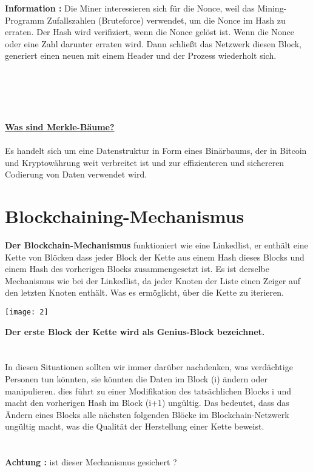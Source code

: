 \documentclass[ngerman]{scrreprt}
\begin{document}
\color{green}
\huge{\textbf{Information :}} 
\color{black}
\normalsize
Die Miner interessieren sich für die Nonce, weil das Mining-Programm Zufallszahlen (Bruteforce) verwendet, um die Nonce im Hash zu erraten. Der Hash wird verifiziert, wenn die Nonce gelöst ist. Wenn die Nonce oder eine Zahl darunter erraten wird. Dann schließt das Netzwerk diesen Block, generiert einen neuen mit einem Header und der Prozess wiederholt sich. \\ \\ \\ \\ \\ \\

\large
\underline{\textbf{Was sind Merkle-Bäume?}} \\ \\
\normalsize
Es handelt sich um eine Datenstruktur in Form eines Binärbaums, der in Bitcoin und Kryptowährung weit verbreitet ist und zur effizienteren und sichereren Codierung von Daten verwendet wird.




\section{Blockchaining-Mechanismus}
\textbf{Der Blockchain-Mechanismus} funktioniert wie eine Linkedlist, er enthält eine Kette von Blöcken
dass jeder Block der Kette aus einem Hash dieses Blocks und einem Hash des vorherigen Blocks zusammengesetzt ist. Es ist derselbe Mechanismus wie bei der Linkedlist, da jeder Knoten der Liste einen Zeiger auf den letzten Knoten enthält. Was es ermöglicht, über die Kette zu iterieren.

\texttt{[image: 2]}


\textbf{Der erste Block der Kette wird als Genius-Block bezeichnet.} \\ \\ \\


In diesen Situationen sollten wir immer darüber nachdenken, was verdächtige Personen tun könnten, sie könnten die Daten im Block (i) ändern oder manipulieren.
dies führt zu einer Modifikation des tatsächlichen Blocks i und macht den vorherigen Hash im Block (i+1) ungültig. Das bedeutet, dass das Ändern eines Blocks alle nächsten folgenden Blöcke im Blockchain-Netzwerk ungültig macht, was die Qualität der Herstellung einer Kette beweist.\\ \\ \\ 
\color{red}
\huge{\textbf{Achtung :}}
\color{black}
\large
ist dieser Mechanismus gesichert ?\\ \\
\normalsize
 	
\end{document}
